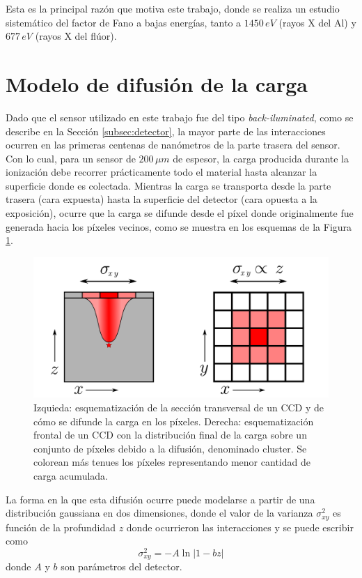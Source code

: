 Esta es la principal razón que motiva este trabajo, donde se realiza un estudio sistemático del factor de Fano a bajas energías, tanto a $1450\,\si{eV}$ (rayos X del Al) y $677\,\si{eV}$ (rayos X del flúor).

\section{Modelo de difusión de la carga}
\noindent Dado que el sensor utilizado en este trabajo fue del tipo \textit{back-iluminated}, como se describe en la Sección \ref{subsec:detector}, la mayor parte de las interacciones ocurren en las primeras centenas de nanómetros de la parte trasera del sensor. Con lo cual, para un sensor de $200\,\si{\mu m}$ de espesor, la carga producida durante la ionización debe recorrer prácticamente todo el material hasta alcanzar la superficie donde es colectada. Mientras la carga se transporta desde la parte trasera (cara expuesta) hasta la superficie del detector (cara opuesta a la exposición), ocurre que la carga se difunde desde el píxel donde originalmente fue generada hacia los píxeles vecinos, como se muestra en los esquemas de la Figura \ref{fig:difusion}.
\begin{figure}[h]
    \centering
        \includegraphics[scale=0.6]{Figs/difusion.pdf}
    \caption{Izquieda: esquematización de la sección transversal de un CCD y de cómo se difunde la carga en los píxeles. Derecha: esquematización frontal de un CCD con la distribución final de la carga sobre un conjunto de píxeles debido a la difusión, denominado cluster. Se colorean más tenues los píxeles representando menor cantidad de carga acumulada.}
    \label{fig:difusion}
\end{figure}
La forma en la que esta difusión ocurre puede modelarse a partir de una distribución gaussiana en dos dimensiones, donde el valor de la varianza $\sigma_{xy}^{2}$ es función de la profundidad $z$ donde ocurrieron las interacciones y se puede escribir como\cite{DifusionCarga}
\begin{equation*}
    \sigma_{xy}^{2} = -A\ln{|1-bz|}
\end{equation*}
donde $A$ y $b$ son parámetros del detector.

